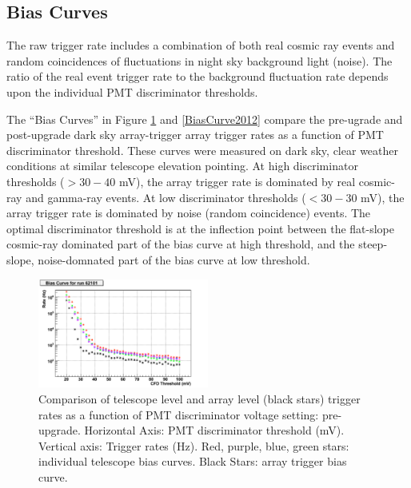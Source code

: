 \documentclass[a4paper]{article}
\begin{document}
\subsection{Bias Curves}
The raw trigger rate includes a combination of both real cosmic ray events and random coincidences of fluctuations in night sky background light (noise). The ratio of the real event trigger rate to the background fluctuation rate depends upon the individual PMT discriminator thresholds. 

The ``Bias Curves'' in Figure \ref{BiasCurve2011} and \ref{BiasCurve2012} compare the   pre-ugrade and post-upgrade dark sky array-trigger array trigger rates as a function of PMT discriminator threshold. These curves were measured on dark sky, clear weather conditions at similar telescope elevation  pointing. At high discriminator thresholds ($>30-40$ mV), the  array trigger rate is dominated by real cosmic-ray and gamma-ray events. At low discriminator thresholds ($< 30-30$ mV), the array trigger rate is dominated by noise (random coincidence) events. The optimal discriminator threshold is at the inflection point between the flat-slope cosmic-ray dominated part of the bias curve at high threshold, and the steep-slope, noise-domnated part of the bias curve at low threshold. 

\begin{figure}[tbp]
  \centering
  \includegraphics[width=0.5\textwidth]{icrc2013-07}
  \caption{Comparison of telescope level and array level (black stars) trigger rates as a function of PMT discriminator voltage setting: pre-upgrade. Horizontal Axis: PMT discriminator threshold (mV). Vertical axis: Trigger rates (Hz). Red, purple, blue, green stars: individual telescope bias curves. Black Stars: array trigger bias curve.}
  \label{BiasCurve2011}
 \end{figure}
\end{document}
